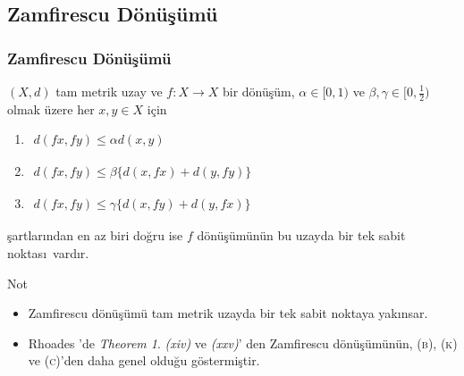 \documentclass[8pt]{beamer}
\begin{document}
\subsection{Zamfirescu D\"{o}n\"{u}\c{s}\"{u}m\"{u}}
\begin{frame}
\frametitle{Zamfirescu D\"{o}n\"{u}\c{s}\"{u}m\"{u}}
 $(X,d)$  tam metrik uzay ve $f: X \rightarrow X$ bir d\"{o}n\"{u}\c{s}\"{u}m, $\alpha \in [0,1)$ ve $\beta , \gamma \in [0,\frac{1}{2}) $ olmak \"{u}zere her $x,y \in X$ i\c{c}in 
    \begin{enumerate}
    \item $\begin{aligned} d(fx, fy)\leq \alpha d(x,y)
      \end{aligned}$
    \item
      $\begin{aligned} d(fx, fy)\leq \beta \big\{
        d(x,fx)+d(y,fy)\big\}
      \end{aligned}$

    \item
      $\begin{aligned} d(fx, fy)\leq \gamma \big\{
        d(x,fy)+d(y,fx)\big\}
      \end{aligned}$
\end{enumerate}
\c{s}artlar\i ndan en az biri do\u{g}ru ise $f$ d\"{o}n\"{u}\c{s}\"{u}m\"{u}n\"{u}n bu uzayda bir tek sabit noktas\i \ vard\i r.
\begin{block}{Not}  
\begin{itemize}[<+-| alert@+>]  
\item Zamfirescu d\"{o}n\"{u}\c{s}\"{u}m\"{u} \cite{Zamfirescu1974} tam metrik uzayda bir tek sabit noktaya yak\i nsar.  
\item Rhoades \cite{Rhoades1977} 'de \emph{Theorem 1}. \emph{(xiv)} ve \emph{(xxv)}' den   Zamfirescu d\"{o}n\"{u}\c{s}\"{u}m\"{u}n\"{u}n, \textsc{(b)}, \textsc{(k)} ve \textsc{(c)}'den daha genel oldu\u{g}u g\"ostermi\c{s}tir.
\end{itemize}

\end{block}
\end{frame}%
\end{document}
